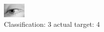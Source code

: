 \begin{figure}[h!]
\begin{center}
\includegraphics[width=0.60\columnwidth]{figures/ID2956_class_3_target_4.png}
\end{center}
\caption{ Classification: 3 actual target: 4}
\label{fig:ID2956_class_3_target_4}
\end{figure}
